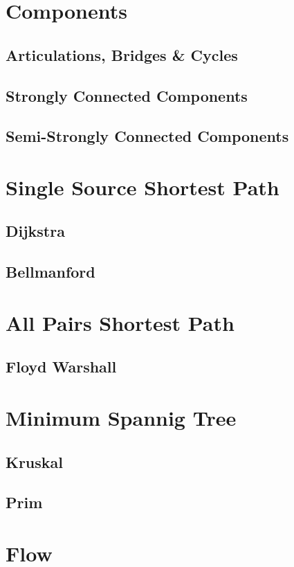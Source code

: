 \documentclass[10pt,a4paper]{report}
\begin{document}
	\section{Components}
		\subsection{Articulations, Bridges \& Cycles}
		\subsection{Strongly Connected Components}
		\subsection{Semi-Strongly Connected Components}
	
	\section{Single Source Shortest Path}
		\subsection{Dijkstra}
		\subsection{Bellmanford}
			
		
	\section{All Pairs Shortest Path}
		\subsection{Floyd Warshall}
		
	\section{Minimum Spannig Tree}
		\subsection{Kruskal}
		\subsection{Prim}
		
	\section{Flow}
\end{document}
